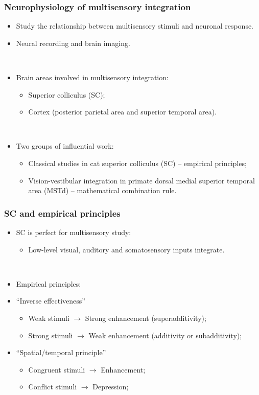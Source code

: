 \documentclass{beamer}
\begin{document}
\begin{frame}
  \frametitle{Neurophysiology of multisensory integration}
  \begin{itemize}
    \item Study the relationship between multisensory stimuli and neuronal response.
    \item Neural recording and brain imaging.

    ~
    \item Brain areas involved in multisensory integration:
    \begin{itemize}
      \item Superior colliculus (SC);
      \item Cortex (posterior parietal area and superior temporal area).
    \end{itemize}

    ~
    \item Two groups of influential work:
    \begin{itemize}
      \item Classical studies in cat superior colliculus (SC) -- empirical principles;
      \item Vision-vestibular integration in primate dorsal medial superior temporal area (MSTd) -- mathematical combination rule.
    \end{itemize}
  \end{itemize}
\end{frame}

\begin{frame}
  \frametitle{SC and empirical principles \cite{stein_merging_1993}}
  \begin{itemize}
    \item SC is perfect for multisensory study:
    \begin{itemize}
      \item Low-level visual, auditory and somatosensory inputs integrate.
    \end{itemize}

    ~
    \item Empirical principles:
    \item ``Inverse effectiveness''
    \begin{itemize}
      \item Weak stimuli $\rightarrow$ Strong enhancement (superadditivity);
      \item Strong stimuli $\rightarrow$ Weak enhancement (additivity or subadditivity);
    \end{itemize}
    \item ``Spatial/temporal principle''
    \begin{itemize}
      \item Congruent stimuli $\rightarrow$ Enhancement;
      \item Conflict stimuli $\rightarrow$ Depression;
    \end{itemize}
  \end{itemize}
\end{frame}
\end{document}
